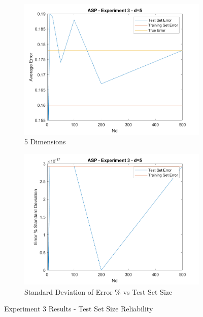 \begin{figure}[h]
	\centering
	\begin{subfigure}{.5\textwidth}
		\centering
		\includegraphics[width=.95\linewidth]{./code/Exp3-results/ErrorComparison_5.png}
		\caption{5 Dimensions}
	\end{subfigure}%
	\begin{subfigure}{.5\textwidth}
		\centering
		\includegraphics[width=.95\linewidth]{./code/Exp3-results/ErrorStandardDeviation_5.png}
		\caption{Standard Deviation of Error \% vs Test Set Size}
	\end{subfigure}
	\caption{Experiment 3 Results - Test Set Size Reliability}
	\label{fig:Exp3}
\end{figure}

